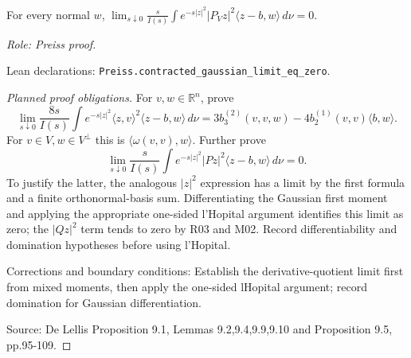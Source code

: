 \begin{lemma}
\label{lem:rigidity-contracted-limit-zero}






For every normal $w$, $\lim_{s\downarrow0}\frac{s}{I(s)}\int e^{-s|z|^2}|P_Vz|^2\langle z-b,w\rangle\,d\nu=0$.
\par\emph{Role: Preiss proof.}
\par Lean declarations: \texttt{Preiss.contracted\_gaussian\_limit\_eq\_zero}.
\end{lemma}
\begin{proof}[Planned proof obligations]

For $v,w\in\mathbb R^n$, prove
\[
 \lim_{s\downarrow0}\frac{8s}{I(s)}\int e^{-s|z|^2}
 \langle z,v\rangle^2\langle z-b,w\rangle\,d\nu
 =3b_3^{(2)}(v,v,w)-4b_2^{(1)}(v,v)\langle b,w\rangle.
\]
For $v\in V,w\in V^\perp$ this is $\langle\omega(v,v),w\rangle$.
Further prove
\[
 \lim_{s\downarrow0}\frac{s}{I(s)}\int e^{-s|z|^2}
 |Pz|^2\langle z-b,w\rangle\,d\nu=0.
\]
To justify the latter, the analogous $|z|^2$ expression has a limit by the
first formula and a finite orthonormal-basis sum. Differentiating the Gaussian
first moment and applying the appropriate one-sided l'Hopital argument
identifies this limit as zero; the $|Qz|^2$ term tends to zero by R03 and M02.
Record differentiability and domination hypotheses before using l'Hopital.
\par Corrections and boundary conditions: Establish the derivative-quotient limit first from mixed moments, then apply the one-sided lHopital argument; record domination for Gaussian differentiation.
\par Source: De Lellis Proposition 9.1, Lemmas 9.2,9.4,9.9,9.10 and Proposition 9.5, pp.95-109.
\end{proof}

